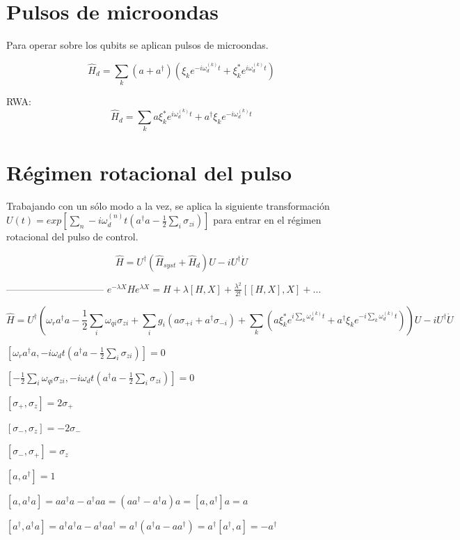 \documentclass[11pt, spanish]{report}
\begin{document}
\section{Pulsos de microondas}

Para operar sobre los qubits se aplican pulsos de microondas.

$$\hat{H}_d = \sum\limits_k (a+a^\dagger) (\xi_k e^{-i\omega_d^{(k)}t} + \xi_k^*e^{i\omega_d^{(k)}t})$$

RWA: $$\hat{H}_d=\sum\limits_k a\xi_k^*e^{i\omega_d^{(k)}t}+ a^\dagger\xi_ke^{-i\omega_d^{(k)}t}$$

\section{Régimen rotacional del pulso}

Trabajando con un sólo modo a la vez, se aplica la siguiente transformación
$U(t) = exp[\sum\limits_n-i \omega_d^{(n)} t(a^\dagger a - \frac{1}{2} \sum\limits_i \sigma_{z i})]$ para entrar en el régimen rotacional del pulso de control.

$$\hat{H} = U^\dagger (\hat{H}_{syst} + \hat{H}_d) U - i U^\dagger \dot{U}$$

------------------------------
$e^{-\lambda X} H e^{\lambda X} = H + \lambda [H,X] +
\frac{\lambda^2}{2!}[[H,X],X] + ...$


$$\hat{H} = U^\dagger (\omega_r a^\dag a - \frac{1}{2} \sum\limits_i \omega_{qi}
\sigma_{zi} + \sum\limits_i g_i (a \sigma_{+ i} + a^\dagger \sigma_{- i}) +
\sum\limits_k (a\xi_k^*e^{i\sum\limits_k \omega_d^{(k)}t}+
a^\dagger\xi_ke^{-i\sum\limits_k \omega_d^{(k)}t})) U - i U^\dagger \dot{U}$$

$[\omega_r a^\dag a, -i \omega_d t(a^\dagger a - \frac{1}{2} \sum\limits_i \sigma_{z i})] = 0$

$[- \frac{1}{2} \sum\limits_i \omega_{qi} \sigma_{zi} , -i \omega_d t(a^\dagger
a - \frac{1}{2} \sum\limits_i \sigma_{z i})] = 0$

$[\sigma_+, \sigma_z] = 2 \sigma_+$

$[\sigma_-, \sigma_z] = - 2 \sigma_-$

$[\sigma_-, \sigma_+] = \sigma_z$

$[a, a^\dagger] = 1$

$[a, a^\dagger a] = a a^\dagger a - a^\dagger a a = (a a^\dagger - a^\dagger a) a = [a, a^\dagger] a = a$

$[a^\dagger, a^\dagger a] = a^\dagger a^\dagger a - a^\dagger a a^\dagger = a^\dagger (a^\dagger a - a a^\dagger) = a^\dagger [a^\dagger, a] = -a^\dagger$
\end{document}
